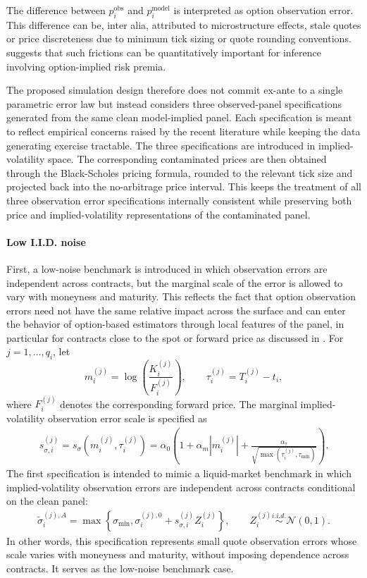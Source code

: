 \documentclass[11pt,a4paper,notitlepage]{article}
\numberwithin{equation}{section}
\begin{document}
The difference between $p_i^{\mathrm{obs}}$ and $p_i^{\mathrm{model}}$ is interpreted as option observation error.
This difference can be, inter alia, attributed to microstructure effects, stale quotes or price discreteness due to minimum tick sizing or quote rounding conventions. \citet{duarte2024very}
suggests that such frictions can be quantitatively important for inference involving option-implied risk premia. 

The proposed simulation design therefore does not commit ex-ante to a single parametric error law but instead considers three observed-panel specifications generated from the same clean model-implied panel. Each specification is meant to reflect empirical concerns raised by the recent literature while keeping the data generating exercise tractable. The three specifications are introduced in implied-volatility space. The corresponding contaminated prices are then obtained through the Black-Scholes pricing formula, rounded to the relevant tick size and projected back into the no-arbitrage price interval. This keeps the treatment of all three observation error specifications internally consistent while preserving both price and implied-volatility representations of the contaminated panel.

\paragraph{Low I.I.D. noise}
First, a low-noise benchmark is introduced in which observation errors are independent across contracts, but the marginal scale of the error is allowed to vary with moneyness and maturity. This reflects the fact that option observation errors need not have the same relative impact across the surface and can enter the behavior of option-based estimators through local features of the panel, in particular for contracts close to the spot or forward price as discussed in \cite{chongtodorov2024vov}.
For $j=1,\ldots,q_i$, let
\[
m_i^{(j)}=\log\left(\frac{K_i^{(j)}}{F_i^{(j)}}\right),
\qquad
\tau_i^{(j)}=T_i^{(j)}-t_i,
\]
where $F_i^{(j)}$ denotes the corresponding forward price. The marginal implied-volatility observation error scale is specified as
\begin{align}
s_{\sigma,i}^{(j)}
=
s_\sigma(m_i^{(j)},\tau_i^{(j)})
=
\alpha_0\left(
1+\alpha_m |m_i^{(j)}|
+\frac{\alpha_\tau}{\sqrt{\max(\tau_i^{(j)},\tau_{\min})}}
\right).
\label{eq:iv_error_scale}
\end{align}
The first specification is intended to mimic a liquid-market benchmark in which implied-volatility observation errors are independent across contracts conditional on the clean panel:
\begin{align}
\tilde\sigma_i^{(j),A}
=
\max\left\{
\sigma_{\min},
\sigma_i^{(j),0}
+
s_{\sigma,i}^{(j)}Z_i^{(j)}
\right\},
\qquad
Z_i^{(j)}\overset{i.i.d.}{\sim}\mathcal{N}(0,1).
\label{eq:noise_liquid}
\end{align}
In other words, this specification represents small quote observation errors whose scale varies with moneyness and maturity, without imposing dependence across contracts. It serves as the low-noise benchmark case.
\end{document}
